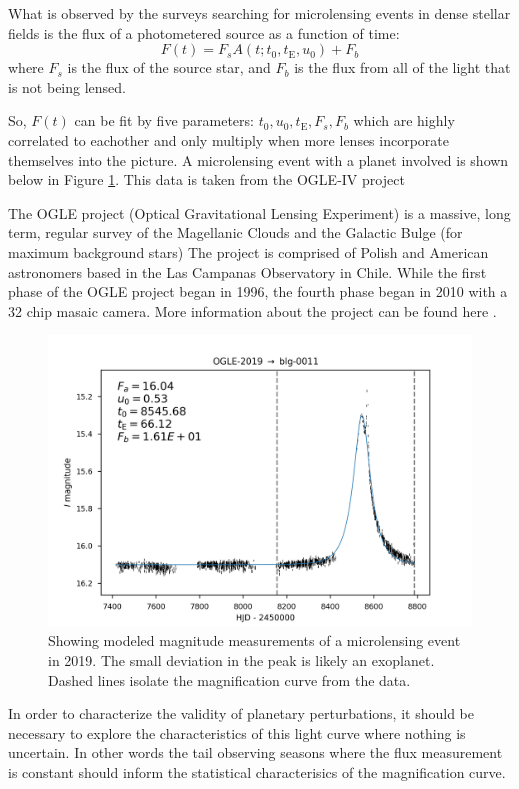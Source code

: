 \documentclass[12pt, a4paper]{article}
\begin{document}
What is observed by the surveys searching for microlensing events in dense stellar fields is the flux of a photometered source as a function of time:
\[F(t)=F_sA(t; t_0, t_{\mathrm E}, u_0)+F_b\]
where $F_s$ is the flux of the source star, and $F_b$ is the flux from all of the light that is not being lensed.

So, $F(t)$ can be fit by five parameters: $t_0,u_0,t_\mathrm E,F_s,F_b$ which are highly correlated to eachother and only multiply when more lenses incorporate themselves into the picture.
A microlensing event with a planet involved is shown below in Figure
\ref{fig:phot_dat}. This data is taken from the OGLE-IV project \cite{ogle}

The OGLE project (Optical Gravitational Lensing Experiment) is a massive, long term, regular survey of the Magellanic Clouds and the Galactic Bulge (for maximum background stars)
The project is comprised of Polish and American astronomers based in the Las Campanas Observatory in Chile.
While the first phase of the OGLE project began in 1996, the fourth phase began in 2010 with a 32 chip masaic camera.
More information about the project can be found here \cite{ogle}.

\begin{figure}[H]
\centering
\includegraphics[width=\textwidth]{phot_dat}
\caption{Showing modeled magnitude measurements of a microlensing event in 2019.
  The small deviation in the peak is likely an exoplanet.
  Dashed lines isolate the magnification curve from the data.}
\label{fig:phot_dat}
\end{figure}

In order to characterize the validity of planetary perturbations, it should be necessary to explore the characteristics of this light curve where nothing is uncertain.
In other words the tail observing seasons where the flux measurement is constant should inform the statistical characterisics of the magnification curve.
\end{document}
